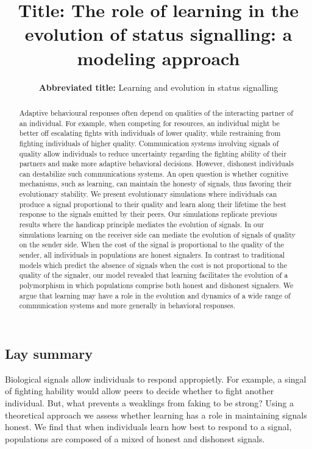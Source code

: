 \documentclass[
  12pt,
]{article}
\title{\large \textbf{Title:} The role of learning in the evolution of
status signalling: a modeling approach}
\subtitle{\normalsize \textbf{Abbreviated title:} Learning and evolution
in status signalling}
\date{}
\begin{document}
\maketitle
\begin{flushleft}
\end{flushleft}
\begin{abstract}
Adaptive behavioural responses often depend on qualities of the
interacting partner of an individual. For example, when competing for
resources, an individual might be better off escalating fights with
individuals of lower quality, while restraining from fighting
individuals of higher quality. Communication systems involving signals
of quality allow individuals to reduce uncertainty regarding the
fighting ability of their partners and make more adaptive behavioral
decisions. However, dishonest individuals can destabilize such
communications systems. An open question is whether cognitive
mechanisms, such as learning, can maintain the honesty of signals, thus
favoring their evolutionary stability. We present evolutionary
simulations where individuals can produce a signal proportional to their
quality and learn along their lifetime the best response to the signals
emitted by their peers. Our simulations replicate previous results where
the handicap principle mediates the evolution of signals. In our
simulations learning on the receiver side can mediate the evolution of
signals of quality on the sender side. When the cost of the signal is
proportional to the quality of the sender, all individuals in
populations are honest signalers. In contrast to traditional models
which predict the absence of signals when the cost is not proportional
to the quality of the signaler, our model revealed that learning
facilitates the evolution of a polymorphism in which populations
comprise both honest and dishonest signalers. We argue that learning may
have a role in the evolution and dynamics of a wide range of
communication systems and more generally in behavioral responses.
\end{abstract}
\subsection*{Lay summary}
Biological signals allow individuals to respond appropietly. For
example, a singal of fighting hability would allow peers to decide
whether to fight another individual. But, what prevents a weaklings from
faking to be strong? Using a theoretical approach we assess whether
learning has a role in maintaining signals honest. We find that when
individuals learn how best to respond to a signal, populations are
composed of a mixed of honest and dishonest signals.
\end{document}
